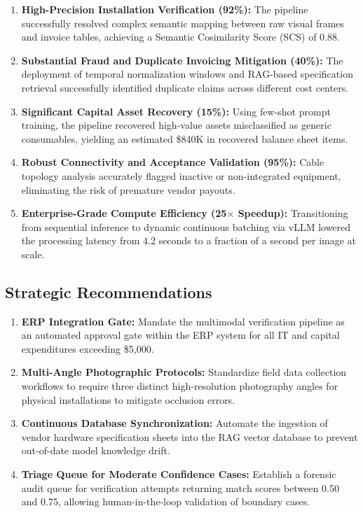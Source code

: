 \documentclass[11pt,letterpaper]{report}
\begin{document}
\begin{keyfindings}
\begin{enumerate}
    \item \textbf{High-Precision Installation Verification (92\%):} The pipeline successfully resolved complex semantic mapping between raw visual frames and invoice tables, achieving a Semantic Cosimilarity Score (SCS) of 0.88.
    \item \textbf{Substantial Fraud and Duplicate Invoicing Mitigation (40\%):} The deployment of temporal normalization windows and RAG-based specification retrieval successfully identified duplicate claims across different cost centers.
    \item \textbf{Significant Capital Asset Recovery (15\%):} Using few-shot prompt training, the pipeline recovered high-value assets misclassified as generic consumables, yielding an estimated \$840K in recovered balance sheet items.
    \item \textbf{Robust Connectivity and Acceptance Validation (95\%):} Cable topology analysis accurately flagged inactive or non-integrated equipment, eliminating the risk of premature vendor payouts.
    \item \textbf{Enterprise-Grade Compute Efficiency (25$\times$ Speedup):} Transitioning from sequential inference to dynamic continuous batching via vLLM lowered the processing latency from 4.2 seconds to a fraction of a second per image at scale.
\end{enumerate}
\end{keyfindings}

\subsection*{Strategic Recommendations}

\begin{recommendations}
\begin{enumerate}
    \item \textbf{ERP Integration Gate:} Mandate the multimodal verification pipeline as an automated approval gate within the ERP system for all IT and capital expenditures exceeding \$5,000.
    \item \textbf{Multi-Angle Photographic Protocols:} Standardize field data collection workflows to require three distinct high-resolution photography angles for physical installations to mitigate occlusion errors.
    \item \textbf{Continuous Database Synchronization:} Automate the ingestion of vendor hardware specification sheets into the RAG vector database to prevent out-of-date model knowledge drift.
    \item \textbf{Triage Queue for Moderate Confidence Cases:} Establish a forensic audit queue for verification attempts returning match scores between 0.50 and 0.75, allowing human-in-the-loop validation of boundary cases.
\end{enumerate}
\end{recommendations}
\end{document}
